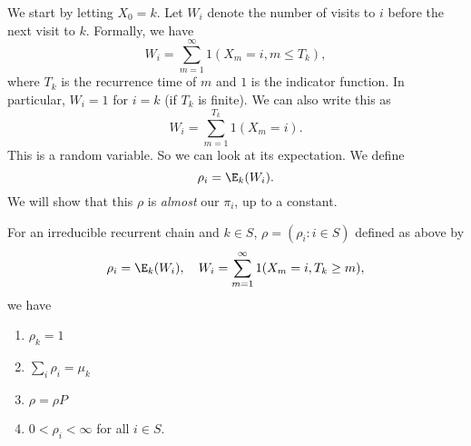 \documentclass[a4paper]{article}
\begin{document}
We start by letting $X_0 = k$. Let $W_i$ denote the number of visits to $i$ before the next visit to $k$. Formally, we have
\[
  W_i = \sum_{m = 1}^\infty 1(X_m = i, m \leq T_k),
\]
where $T_k$ is the recurrence time of $m$ and $1$ is the indicator function. In particular, $W_i = 1$ for $i = k$ (if $T_k$ is finite). We can also write this as
\[
  W_i = \sum_{m = 1}^{T_k} 1(X_m = i).
\]
This is a random variable. So we can look at its expectation. We define
\[
  \rho_i = \E_k(W_i).
\]
We will show that this $\rho$ is \emph{almost} our $\pi_i$, up to a constant.
\begin{prop}
  For an irreducible recurrent chain and $k \in S$, $\rho = (\rho_i: i \in S)$ defined as above by
  \[
    \rho_i = \E_k(W_i),\quad W_i = \sum_{m = 1}^\infty 1(X_m = i, T_k \geq m),
  \]
  we have
  \begin{enumerate}
    \item $\rho_k = 1$
    \item $\sum_i \rho_i = \mu_k$
    \item $\rho = \rho P$
    \item $0 < \rho_i < \infty$ for all $i \in S$.
  \end{enumerate}
\end{prop}
\end{document}
